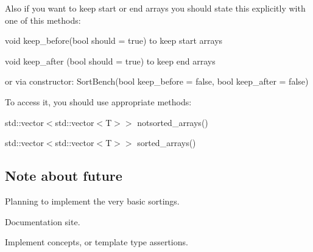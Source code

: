 Also if you want to keep start or end arrays you should state this explicitly with one of this methods\+:
\begin{DoxyItemize}
\item {\ttfamily void keep\+\_\+before(bool should = true)} to keep start arrays
\item {\ttfamily void keep\+\_\+after (bool should = true)} to keep end arrays
\item or via constructor\+: {\ttfamily Sort\+Bench(bool keep\+\_\+before = false, bool keep\+\_\+after = false)}
\end{DoxyItemize}

To access it, you should use appropriate methods\+:
\begin{DoxyItemize}
\item {\ttfamily std\+::vector$<$std\+::vector$<$T$>$$>$ notsorted\+\_\+arrays()}
\item {\ttfamily std\+::vector$<$std\+::vector$<$T$>$$>$ sorted\+\_\+arrays()} \subsection*{Note about future}
\end{DoxyItemize}


\begin{DoxyEnumerate}
\item Planning to implement the very basic sortings.
\item Documentation site.
\item Implement concepts, or template type assertions. 
\end{DoxyEnumerate}